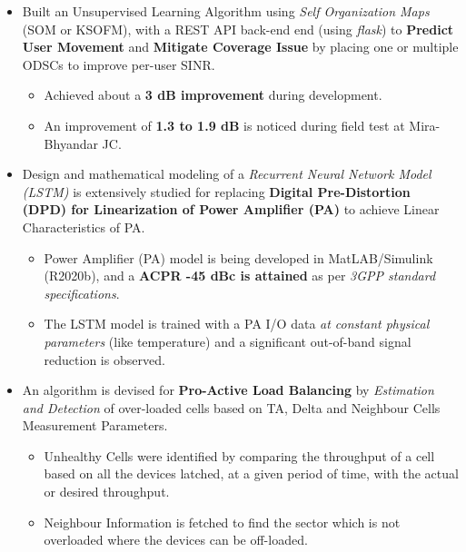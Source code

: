 \begin{itemize}
	\item Built an Unsupervised Learning Algorithm using \textit{Self Organization Maps} (SOM or KSOFM), with a REST API back-end end (using \textit{flask}) to \textbf{Predict User Movement} and \textbf{Mitigate Coverage Issue} by placing one or multiple ODSCs to improve per-user SINR.
	\begin{itemize}
		\item Achieved about a \textbf{3 dB improvement} during development.
		\item An improvement of \textbf{1.3 to 1.9 dB} is noticed during field test at Mira-Bhyandar JC.
	\end{itemize}

	\item Design and mathematical modeling of a \textit{Recurrent Neural Network Model (LSTM)} is extensively studied for replacing \textbf{Digital Pre-Distortion (DPD) for Linearization of Power Amplifier (PA)} to achieve Linear Characteristics of PA.
	\begin{itemize}
		\item Power Amplifier (PA) model is being developed in MatLAB/Simulink (R2020b), and a \textbf{ACPR -45 dBc is attained} as per \textit{3GPP standard specifications}.
		\item The LSTM model is trained with a PA I/O data \textit{at constant physical parameters} (like temperature) and a significant out-of-band signal reduction is observed.
	\end{itemize}
	
	\item An algorithm is devised for \textbf{Pro-Active Load Balancing} by \textit{Estimation and Detection} of over-loaded cells based on TA, Delta and Neighbour Cells Measurement Parameters.
	
	\begin{itemize}
		\item Unhealthy Cells were identified by comparing the throughput of a cell based on all the devices latched, at a given period of time, with the actual or desired throughput.
		
		\item Neighbour Information is fetched to find the sector which is not overloaded where the devices can be off-loaded.
		
	\end{itemize}


\end{itemize}
